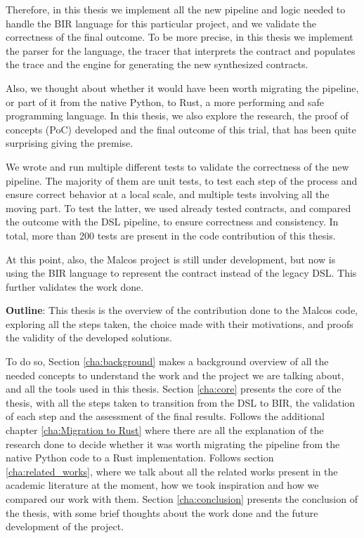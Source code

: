 Therefore, in this thesis we implement all the new pipeline and logic needed to handle
the BIR language for this particular project, and we validate the correctness of
the final outcome. To be more precise, in this thesis we implement the parser
for the language, the tracer that interprets the contract and populates the trace
and the engine for generating the new synthesized contracts.

Also, we thought about whether it would have been worth migrating the pipeline, or
part of it from the native Python, to Rust, a more performing and safe programming
language. In this thesis, we also explore the research, the proof of concepts (PoC)
developed and the final outcome of this trial, that has been quite surprising giving
the premise.

We wrote and run multiple different tests to validate the correctness of the new
pipeline. The majority of them are unit tests, to test each step of the process and
ensure correct behavior at a local scale, and multiple tests involving all the
moving part. To test the latter, we used already tested contracts, and compared the
outcome with the DSL pipeline, to ensure correctness and consistency. In total,
more than 200 tests are present in the code contribution of this thesis.

At this point, also, the Malcos project is still under development, but now is using
the BIR language to represent the contract instead of the legacy DSL. This
further validates the work done.

\textbf{Outline}: This thesis is the overview of the contribution done to the
Malcos code, exploring all the steps taken, the choice made with their
motivations, and proofs the validity of the developed solutions.

To do so, Section \ref{cha:background} makes a background overview of all the
needed concepts to understand the work and the project we are talking about, and
all the tools used in this thesis. Section \ref{cha:core} presents the core of
the thesis, with all the steps taken to transition from the DSL to BIR, the
validation of each step and the assessment of the final results. Follows the additional
chapter \ref{cha:Migration to Rust} where there are all the explanation of the research
done to decide whether it was worth migrating the pipeline from the native Python
code to a Rust implementation. Follows section \ref{cha:related_works}, where we
talk about all the related works present in the academic literature at the moment,
how we took inspiration and how we compared our work with them. Section \ref{cha:conclusion}
presents the conclusion of the thesis, with some brief thoughts about the work
done and the future development of the project.